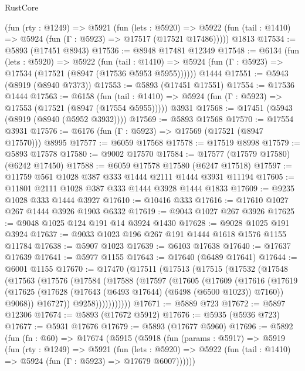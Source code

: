\begin{lexlean}{RustCore}
\begin{coremodule}
    (fun (rty : @1249) =>
    @5921
      (fun (lets : @5920) =>
      @5922 (fun (tail : @1410) => @5924 (fun (Γ : @5923) => @17517 (@17521 @17486)))))
    @1813
@17534 := @5893 (@17451 @8943)
@17536 := @8948 @17481 @12349
@17548 := @6134
    (fun (lets : @5920) =>
    @5922
      (fun (tail : @1410) =>
      @5924 (fun (Γ : @5923) => @17534 (@17521 (@8947 (@17536 @5953 @5955))))))
    @1444
@17551 := @5943 (@8919 (@8940 @7373))
@17553 := @5893 (@17451 @17551)
@17554 := @17536 @1444
@17563 := @6158
    (fun (tail : @1410) => @5924 (fun (Γ : @5923) => @17553 (@17521 (@8947 (@17554 @5955)))))
    @3931
@17568 := @17451 (@5943 (@8919 (@8940 (@5952 @3932))))
@17569 := @5893 @17568
@17570 := @17554 @3931
@17576 := @6176 (fun (Γ : @5923) => @17569 (@17521 (@8947 @17570))) @8995
@17577 := @6059 @17568
@17578 := @17519 @8998
@17579 := @5893 @17578
@17580 := @9002 @17570
@17584 := @17577 (@17579 @17580) (@6242 @17450)
@17588 := @6059 @17578 @17580 (@6247 @17518)
@17597 := @11759 @561 @1028 @387 @333 @1444 @2111 @1444 @3931 @11194
@17605 := @11801 @2111 @1028 @387 @333 @1444 @3928 @1444 @1833
@17609 := @9235 @1028 @333 @1444 @3927
@17610 := @10416 @333
@17616 := @17610 @1027 @267 @1444 @3926 @1903 @6332
@17619 := @9043 @1027 @267 @3926
@17625 := @9048 @1025 @124 @191 @14 @3924 @1430
@17628 := @9028 @1025 @191 @3924
@17637 := @9033 @1023 @196 @267 @191 @1444 @1618 @1576 @1155 @11784
@17638 := @5907 @1023
@17639 := @6103 @17638
@17640 := @17637 @17639
@17641 := @5977 @1155
@17643 := @17640 (@6489 @17641)
@17644 := @6001 @1155
@17670 := @17470
    (@17511
      (@17513
        (@17515
          (@17532
            (@17548
              (@17563
                (@17576
                  (@17584
                    (@17588
                      (@17597
                        (@17605
                          (@17609
                            (@17616
                              (@17619
                                (@17625
                                  (@17628 (@17643 (@6493 @17644) (@6498 (@6500 @1023)) @7160))
                                  @9068))
                              @16727))
                          @9258)))))))))))
@17671 := @5889 @723
@17672 := @5897 @12306
@17674 := @5893 (@17672 @5912)
@17676 := @5935 (@5936 @723)
@17677 := @5931 @17676
@17679 := @5893 (@17677 @5960)
@17696 := @5892
    (fun (fn : @60) =>
    @17674
      (@5915
        (@5918
          (fun (params : @5917) =>
          @5919
            (fun (rty : @1249) =>
            @5921
              (fun (lets : @5920) =>
              @5922 (fun (tail : @1410) => @5924 (fun (Γ : @5923) => @17679 @6007))))))

\end{coremodule}
\end{lexlean}
